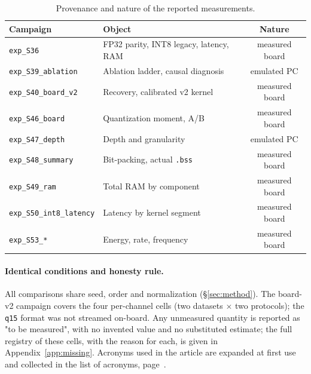 \begin{table}[t]
\centering
\caption{Provenance and nature of the reported measurements.}
\label{tab:sources}
\begin{tabular}{llc}
\toprule
Campaign & Object & Nature \\
\midrule
\texttt{exp\_S36}            & FP32 parity, INT8 legacy, latency, RAM & measured board \\
\texttt{exp\_S39\_ablation}  & Ablation ladder, causal diagnosis      & emulated PC \\
\texttt{exp\_S40\_board\_v2} & Recovery, calibrated v2 kernel         & measured board \\
\texttt{exp\_S46\_board}     & Quantization moment, A/B               & measured board \\
\texttt{exp\_S47\_depth}     & Depth and granularity                  & emulated PC \\
\texttt{exp\_S48\_summary}   & Bit-packing, actual \texttt{.bss}      & measured board \\
\texttt{exp\_S49\_ram}       & Total RAM by component                 & measured board \\
\texttt{exp\_S50\_int8\_latency} & Latency by kernel segment          & measured board \\
\texttt{exp\_S53\_*}         & Energy, rate, frequency                & measured board \\
\bottomrule
\end{tabular}
\end{table}

\paragraph{Identical conditions and honesty rule.} All comparisons share seed, order and normalization
(\S\ref{sec:method}). The board-v2 campaign covers the four per-channel cells (two datasets $\times$ two
protocols); the \texttt{q15} format was not streamed on-board. Any unmeasured quantity is reported as "to
be measured", with no invented value and no substituted estimate; the full registry of these cells,
with the reason for each, is given in Appendix~\ref{app:missing}. Acronyms used in the article are
expanded at first use and collected in the list of acronyms, page~\pageref{sec:acronyms}.
